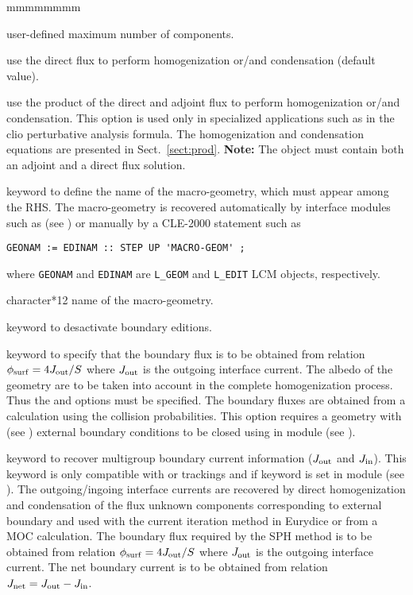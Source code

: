 \begin{ListeDeDescription}{mmmmmmmm}
\item[\dusa{maxpts}] user-defined maximum number of components.

\item[\moc{DIRE}] use the direct flux to perform homogenization or/and
condensation (default value).

\item[\moc{PROD}] use the product of the direct and adjoint flux to perform homogenization or/and
condensation. This option is used only in specialized applications such as in the {\sc clio} perturbative
analysis formula.\cite{clio} The homogenization and condensation equations are presented in Sect.~\ref{sect:prod}.
{\bf Note:} The  object must contain both an adjoint and a direct flux solution.

\item[\moc{MGEO}] keyword to define the name of the macro-geometry, which must appear among the RHS. The macro-geometry is recovered automatically
by interface modules such as  (see ) or manually by a CLE-2000 statement such as
\begin{verbatim}
GEONAM := EDINAM :: STEP UP 'MACRO-GEOM' ;
\end{verbatim}
\noindent where {\tt GEONAM} and {\tt EDINAM} are {\tt L\_GEOM} and {\tt L\_EDIT} LCM objects, respectively.

\item[\dusa{MACGEO}] character*12 name of the macro-geometry.

\item[\moc{NADF}] keyword to desactivate boundary editions.

\item[\moc{ALBS}] keyword to specify that the boundary flux is to be obtained from relation
$\phi_{\rm surf}=4J_{\rm out}/S$ where $J_{\rm out}$ is the outgoing interface current. The albedo of
the geometry are to be taken into account in the complete homogenization process. Thus the 
and  options must be specified. The boundary fluxes are obtained from a calculation using the collision
probabilities. This option requires a geometry with  (see ) external boundary conditions to
be closed using  in module  (see ).\cite{ALSB2}

\item[\moc{JOUT}] keyword to recover multigroup boundary current information ($J_{\rm out}$ and $J_{\rm in}$). This keyword
is only compatible with  or  trackings and if keyword  is set in module 
(see ). The outgoing/ingoing interface currents are recovered by direct homogenization and condensation of the
flux unknown components corresponding to external boundary and used with the current iteration method in Eurydice or from a MOC
calculation. The boundary flux required by the SPH method is to be obtained from relation $\phi_{\rm surf}=4J_{\rm out}/S$ where
$J_{\rm out}$ is the outgoing interface current. The net boundary current is to be obtained from relation
$J_{\rm net}=J_{\rm out}-J_{\rm in}$.


\end{ListeDeDescription}
